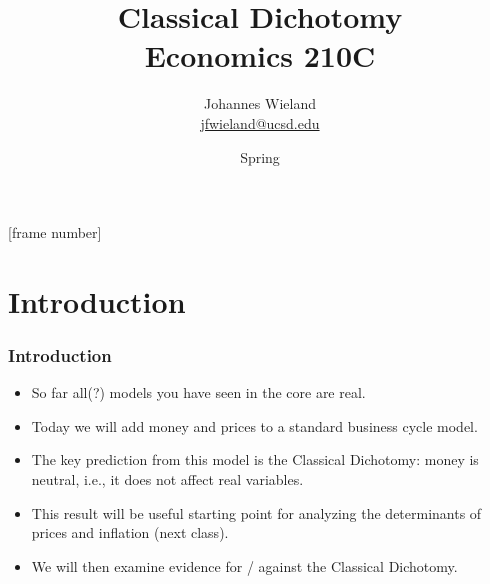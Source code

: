 \documentclass[english,xcolor=svgnames]{beamer}
\begin{document}
\title{Classical Dichotomy \\ Economics 210C}
\vspace{1cm}
\author[shortname]{
\begin{tabular}{c}
	Johannes Wieland \\ 
	\footnotesize \href{mailto:jfwieland@ucsd.edu}{jfwieland@ucsd.edu}  \\ 
\end{tabular}
}

\date{Spring \the\year}

\makebeamertitle
{}[frame number]{}

\addtocounter{framenumber}{-1}







\section{Introduction}


\begin{frame}
\frametitle{Introduction}
\begin{itemize}
	\item So far all(?) models you have seen in the core are real.
	\item Today we will add money and prices to a standard business cycle model.
	\item The key prediction from this model is the Classical Dichotomy: money is neutral, i.e., it does not affect real variables.
	\item This result will be useful starting point for analyzing the determinants of prices and inflation (next class).
	\item We will then examine evidence for / against the Classical Dichotomy.
\end{itemize}
\end{frame}
\end{document}
